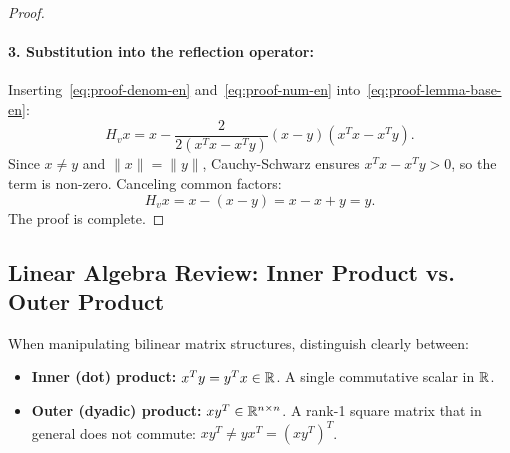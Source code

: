 \begin{proof}
\paragraph{3. Substitution into the reflection operator:}
Inserting~\eqref{eq:proof-denom-en} and~\eqref{eq:proof-num-en} into~\eqref{eq:proof-lemma-base-en}:
\begin{equation}
    H_v x = x - \frac{2}{2 (x^T x - x^T y)} (x - y) (x^T x - x^T y).
\end{equation}
Since $x \neq y$ and $\|x\| = \|y\|$, Cauchy-Schwarz ensures $x^T x - x^T y > 0$, so the term is non-zero. Canceling common factors:
\begin{equation}
    H_v x = x - (x - y) = x - x + y = y.
\end{equation}
The proof is complete.
\end{proof}

\subsection{Linear Algebra Review: Inner Product vs. Outer Product}
When manipulating bilinear matrix structures, distinguish clearly between:
\begin{itemize}
    \item \textbf{Inner (dot) product:} $x^T y = y^T x \in \mathbb{R}$. A single commutative scalar in $\mathbb{R}$.
    \item \textbf{Outer (dyadic) product:} $x y^T \in \mathbb{R}^{n \times n}$. A rank-1 square matrix that in general does not commute: $x y^T \neq y x^T = (x y^T)^T$.
\end{itemize}

